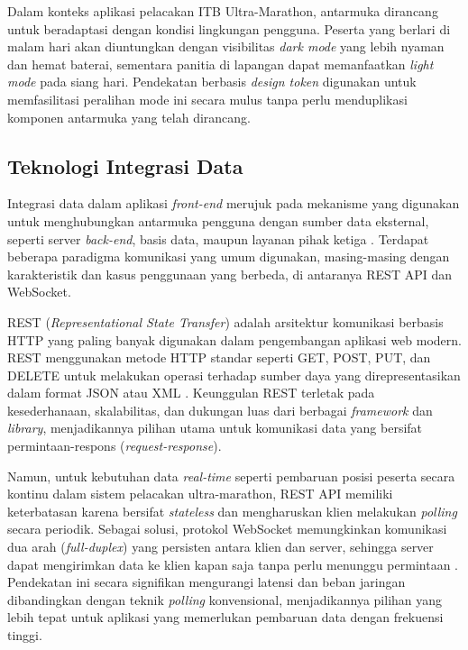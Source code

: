 Dalam konteks aplikasi pelacakan ITB Ultra-Marathon, antarmuka dirancang untuk beradaptasi dengan kondisi lingkungan pengguna. Peserta yang berlari di malam hari akan diuntungkan dengan visibilitas \textit{dark mode} yang lebih nyaman dan hemat baterai, sementara panitia di lapangan dapat memanfaatkan \textit{light mode} pada siang hari. Pendekatan berbasis \textit{design token} digunakan untuk memfasilitasi peralihan mode ini secara mulus tanpa perlu menduplikasi komponen antarmuka yang telah dirancang.

\subsection{Teknologi Integrasi Data}
Integrasi data dalam aplikasi \textit{front-end} merujuk pada mekanisme yang digunakan untuk menghubungkan antarmuka pengguna dengan sumber data eksternal, seperti server \textit{back-end}, basis data, maupun layanan pihak ketiga \cite{richardson2008restful}. Terdapat beberapa paradigma komunikasi yang umum digunakan, masing-masing dengan karakteristik dan kasus penggunaan yang berbeda, di antaranya REST API dan WebSocket.

REST (\textit{Representational State Transfer}) adalah arsitektur komunikasi berbasis HTTP yang paling banyak digunakan dalam pengembangan aplikasi web modern. REST menggunakan metode HTTP standar seperti GET, POST, PUT, dan DELETE untuk melakukan operasi terhadap sumber daya yang direpresentasikan dalam format JSON atau XML \cite{fielding2000architectural}. Keunggulan REST terletak pada kesederhanaan, skalabilitas, dan dukungan luas dari berbagai \textit{framework} dan \textit{library}, menjadikannya pilihan utama untuk komunikasi data yang bersifat permintaan-respons (\textit{request-response}).

Namun, untuk kebutuhan data \textit{real-time} seperti pembaruan posisi peserta secara kontinu dalam sistem pelacakan ultra-marathon, REST API memiliki keterbatasan karena bersifat \textit{stateless} dan mengharuskan klien melakukan \textit{polling} secara periodik. Sebagai solusi, protokol WebSocket memungkinkan komunikasi dua arah (\textit{full-duplex}) yang persisten antara klien dan server, sehingga server dapat mengirimkan data ke klien kapan saja tanpa perlu menunggu permintaan \cite{pimentel2012websocket}. Pendekatan ini secara signifikan mengurangi latensi dan beban jaringan dibandingkan dengan teknik \textit{polling} konvensional, menjadikannya pilihan yang lebih tepat untuk aplikasi yang memerlukan pembaruan data dengan frekuensi tinggi.

